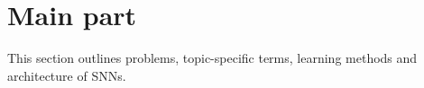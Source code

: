 \section{Main part}
\label{sec:main_part}
This section outlines problems, topic-specific terms, learning methods and architecture of \acp{SNN}.




